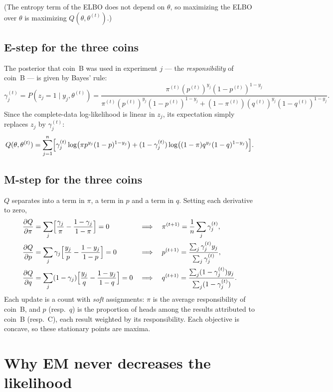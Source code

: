 \begin{notechapter}
(The entropy term of the ELBO does not depend on $\theta$, so maximizing the ELBO
over $\theta$ is maximizing $Q(\theta,\theta^{(t)})$.)

\subsection{E-step for the three coins}

The posterior that coin~B was used in experiment $j$ --- the \emph{responsibility}
of coin~B --- is given by Bayes' rule:
\[
  \gamma_j^{(t)} = P(z_j = 1\mid y_j,\theta^{(t)})
  = \frac{\pi^{(t)}(p^{(t)})^{y_j}(1-p^{(t)})^{1-y_j}}
         {\pi^{(t)}(p^{(t)})^{y_j}(1-p^{(t)})^{1-y_j} + (1-\pi^{(t)})(q^{(t)})^{y_j}(1-q^{(t)})^{1-y_j}} .
\]
Since the complete-data log-likelihood is linear in $z_j$, its expectation simply
replaces $z_j$ by $\gamma_j^{(t)}$:
\[
  Q(\theta,\theta^{(t)}) = \sum_{j=1}^n\Bigl[\gamma_j^{(t)}\log\bigl(\pi p^{y_j}(1-p)^{1-y_j}\bigr)
  + (1-\gamma_j^{(t)})\log\bigl((1-\pi)q^{y_j}(1-q)^{1-y_j}\bigr)\Bigr].
\]

\subsection{M-step for the three coins}

$Q$ separates into a term in $\pi$, a term in $p$ and a term in $q$. Setting each
derivative to zero,
\begin{align*}
  \frac{\partial Q}{\partial\pi} &= \sum_j\Bigl[\frac{\gamma_j}{\pi} - \frac{1-\gamma_j}{1-\pi}\Bigr] = 0
  &&\Longrightarrow\quad \pi^{(t+1)} = \frac1n\sum_j\gamma_j^{(t)},\\
  \frac{\partial Q}{\partial p} &= \sum_j\gamma_j\Bigl[\frac{y_j}{p} - \frac{1-y_j}{1-p}\Bigr] = 0
  &&\Longrightarrow\quad p^{(t+1)} = \frac{\sum_j\gamma_j^{(t)}y_j}{\sum_j\gamma_j^{(t)}},\\
  \frac{\partial Q}{\partial q} &= \sum_j(1-\gamma_j)\Bigl[\frac{y_j}{q} - \frac{1-y_j}{1-q}\Bigr] = 0
  &&\Longrightarrow\quad q^{(t+1)} = \frac{\sum_j(1-\gamma_j^{(t)})y_j}{\sum_j(1-\gamma_j^{(t)})} .
\end{align*}
Each update is a count with \emph{soft} assignments: $\pi$ is the average
responsibility of coin~B, and $p$ (resp.\ $q$) is the proportion of heads among the
results attributed to coin~B (resp.\ C), each result weighted by its
responsibility. Each objective is concave, so these stationary points are maxima.

\section{Why EM never decreases the likelihood}\label{em-algorithm:sec:monotone}


\end{notechapter}
